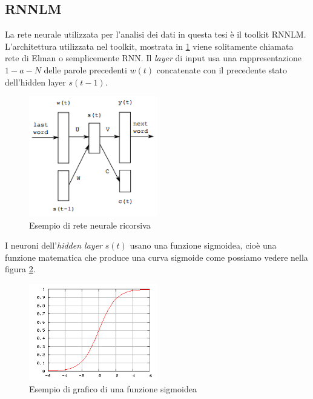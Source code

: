 \documentclass[a4paper,12pt,openright,twoside]{report}
\theoremstyle{definition}
\begin{document}
\subsection{RNNLM}
La rete neurale utilizzata per l'analisi dei dati in questa tesi è il toolkit RNNLM. 
L'architettura utilizzata nel toolkit, mostrata in \ref{fig:rnnlm} viene solitamente chiamata rete di Elman o semplicemente RNN. 
Il \emph{layer} di input usa una rappresentazione $1-a-N$ delle 
parole precedenti $w(t)$ concatenate con il precedente stato dell'hidden layer $s(t - 1)$.
\begin{figure}[ht]
  \centering
      \includegraphics[width=0.5\textwidth]{Immagini/rnnlm_rete.png}
      \caption{Esempio di rete neurale ricorsiva}
\label{fig:rnnlm}
\end{figure}

I neuroni dell'\emph{hidden layer} $s(t)$ usano una funzione sigmoidea, cioè una funzione matematica
che produce una curva sigmoide come possiamo vedere nella figura \ref{fig:sigmoide}.

\begin{figure}[ht]
  \centering
      \includegraphics[width=0.5\textwidth]{Immagini/sigmoide.png}
      \caption{Esempio di grafico di una funzione sigmoidea}
\label{fig:sigmoide}
\end{figure}
\end{document}
